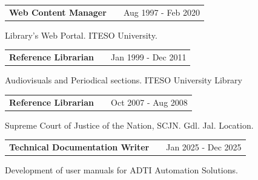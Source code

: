\documentclass[a4paper,12pt]{article}
\makeatletter
\newenvironment{jobshort}[2]
    {
    \begin{tabularx}{\linewidth}{@{}l X r@{}}
    \textbf{#1} & \hfill &  #2 \\[3.75pt]
    \end{tabularx}
    }
    {
    }
\newenvironment{joblong}[2]
    {
    \begin{tabularx}{\linewidth}{@{}l X r@{}}
    \textbf{#1} & \hfill &  #2 \\[3.75pt]
    \end{tabularx}
    \begin{minipage}[t]{\linewidth}
    \begin{itemize}[nosep,after=\strut, leftmargin=1em, itemsep=3pt,label=--]
    }
    {
    \end{itemize}
    \end{minipage}    
    }
\makeatother
\begin{document}
\begin{jobshort}{Web Content Manager}{Aug 1997 - Feb 2020}
Library's Web Portal. ITESO University.
\end{jobshort}


\begin{jobshort}{Reference Librarian}{Jan 1999 - Dec 2011}
Audiovisuals and Periodical sections. ITESO University Library
\end{jobshort}


\begin{jobshort}{Reference Librarian}{Oct 2007 - Aug 2008}
Supreme Court of Justice of the Nation, SCJN. Gdl. Jal. Location.
\end{jobshort}

\begin{jobshort}{Technical Documentation Writer}{Jan 2025 - Dec 2025}
Development of user manuals for ADTI Automation Solutions. 
\end{jobshort}

  

\end{document}
